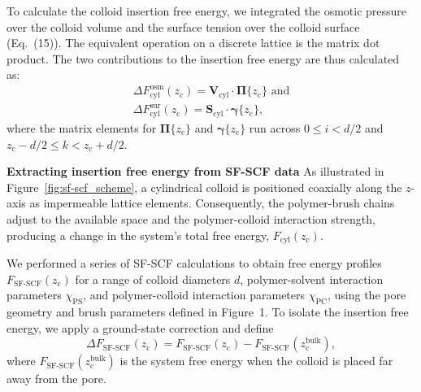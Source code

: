 \documentclass[10pt, a4paper, twocolumn]{article}
\begin{document}
To calculate the colloid insertion free energy, we integrated the osmotic pressure over the colloid volume and the surface tension over the colloid surface (Eq.~(15)).
The equivalent operation on a discrete lattice is the matrix dot product.
The two contributions to the insertion free energy are thus calculated as:
\begin{equation}
    \label{eq:cyl_fe_osm}
    \begin{split}
        \Delta F_{\text{cyl}}^{\text{osm}}(z_{\text{c}}) = \bm{V}_{\text{cyl}} \cdot \boldsymbol{\Pi}\{z_{\text{c}}\} \text{ and} \\
        \Delta F_{\text{cyl}}^{\text{sur}}(z_{\text{c}}) = \bm{S}_{\text{cyl}} \cdot \boldsymbol{\gamma}\{z_{\text{c}}\},
    \end{split}
\end{equation}
where the matrix elements for $\boldsymbol{\Pi}\{z_{\text{c}}\}$ and $\boldsymbol{\gamma}\{z_{\text{c}}\}$ run across $0 \leq i < d/2$ and $z_{\text{c}} - d/2 \leq k < z_{\text{c}} + d/2$.


\bigskip\noindent
\textbf{Extracting insertion free energy from SF-SCF data}
As illustrated in Figure~\ref{fig:sf-scf_scheme}, a cylindrical colloid is positioned coaxially along the $z$-axis as impermeable lattice elements.
Consequently, the polymer-brush chains adjust to the available space and the polymer-colloid interaction strength, producing a change in the system's total free energy, $F_{\text{cyl}}(z_{\text{c}})$.

We performed a series of SF-SCF calculations to obtain free energy profiles $F_{\text{SF-SCF}}(z_{\text{c}})$ for a range of colloid diameters $d$, polymer-solvent interaction parameters $\chi_{\text{PS}}$, and polymer-colloid interaction parameters $\chi_{\text{PC}}$, using the pore geometry and brush parameters defined in Figure~1.  
To isolate the insertion free energy, we apply a ground-state correction and define
\begin{equation}
    \Delta F_{\text{SF-SCF}}(z_{\text{c}}) 
    = F_{\text{SF-SCF}}(z_{\text{c}}) - F_{\text{SF-SCF}}(z_{\text{c}}^{\text{bulk}}),
\end{equation}
where $F_{\text{SF-SCF}}(z_{\text{c}}^{\text{bulk}})$ is the system free energy when the colloid is placed far away from the pore.%
\end{document}
